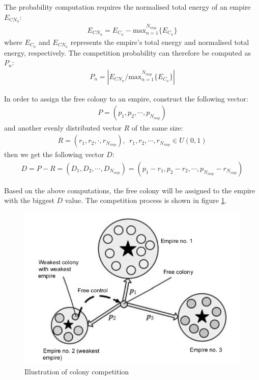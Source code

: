 The probability computation requires the normalised total energy of an empire $E_{CN_n}$: 
\begin{align}
	E_{CN_n} = E_{C_n} - \text{max}_{n = 1}^{N_{imp}}\{E_{C_n}\}
\end{align}
where $E_{C_n}$ and $E_{CN_n}$ represents the empire's total energy and normalised total energy, respectively.
The competition probability can therefore be computed as $P_n$:
\begin{align}
	P_n = |E_{CN_n}/\text{max}_{n = 1}^{N_{imp}}\{E_{C_n}\}|
\end{align}

In order to assign the free colony to an empire, construct the following vector:
\begin{align}
	P = (p_1, p_2, \cdots, p_{N_{imp}})
\end{align}
and another evenly distributed vector $R$ of the same size:
\begin{align}
	R = (r_1, r_2, \cdot, r_{N_{imp}}), \ \ r_1, r_2, \cdots, r_{N_{imp}} \in U(0, 1)
\end{align}
then we get the following vector $D$:
\begin{align}
	D = P-R 
	= (D_1, D_2, \cdots, D_{N_{imp}}) 
	= (p_1 - r_1, p_2 - r_2, \cdots, p_{N_{imp}} - r_{N_{imp}})
\end{align}

Based on the above computations, the free colony will be assigned to the empire with the biggest $D$ value.
The competition process is shown in figure \ref{fig:fig2}.

\begin{figure}[h!]
	\begin{center}
		\includegraphics[width=0.8\linewidth]{sections/figure2.jpg}
		\caption{Illustration of colony competition}
		\label{fig:fig2}
	\end{center}
\end{figure}

